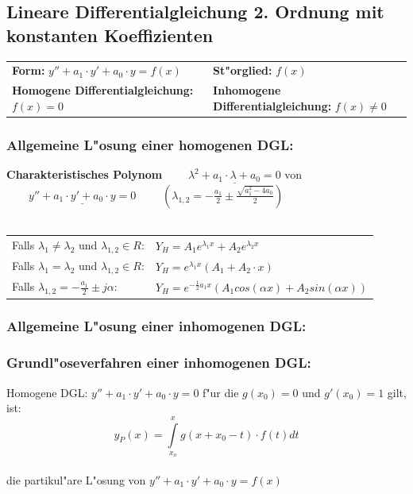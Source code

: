\subsection{Lineare Differentialgleichung 2. Ordnung mit konstanten 
Koeffizienten }
\begin{tabular}{p{8cm}p{8cm}}
\textbf{Form:} $y''+a_1\cdot y'+a_0\cdot y=f(x)$  &
\textbf{St"orglied:} $f(x)$\\
\textbf{Homogene Differentialgleichung:} $f(x)=0$ &
\textbf{Inhomogene Differentialgleichung:} $f(x)\neq 0$
\end{tabular}

\subsubsection{Allgemeine L"osung einer homogenen DGL:\quad{}}
\textbf{Charakteristisches Polynom}
$\qquad\underline{\lambda^2+a_1\cdot\lambda+a_0=0}$ \hspace{1cm}von
$\qquad\underline{y''+a_1\cdot y'+a_0\cdot y=0}$ 
$\qquad(\lambda_{1,2} = -\frac{a_1}{2} \pm \frac{\sqrt{a_1^2 - 4a_0}}{2})$\\ \\
\begin{tabular}{p{8cm}p{8cm}}
Falls $\lambda_1\neq \lambda_2$ und $\lambda_{1,2} \in R$:&
$Y_H=A_1e^{\lambda_1x}+A_2e^{\lambda_2x}$\\
Falls $\lambda_1=\lambda_2$ und $\lambda_{1,2} \in R$:    &
$Y_H=e^{\lambda_1x}(A_1+A_2\cdot x)$\\
Falls $\lambda_{1,2}=-\frac{a_1}{2}\pm j\alpha$:          &
$Y_H=e^{-\frac{1}{2}a_1x}(A_1cos(\alpha x) +A_2sin(\alpha x))$\\
\end{tabular}

\subsubsection{Allgemeine L"osung einer inhomogenen
DGL:\quad{}}

\subsubsection{Grundl"oseverfahren einer inhomogenen DGL:\quad{}} Homogene DGL: $y''+a_1\cdot y'+a_0\cdot y=0$  f"ur die  $g(x_0)=0$  und
$g'(x_0)=1$  gilt, ist:\\
$$y_P(x)=\int\limits_{x_o}^{x} g(x+x_0-t)\cdot f(t)dt$$\\
die partikul"are L"osung von $y''+a_1\cdot y'+a_0\cdot y=f(x)$

